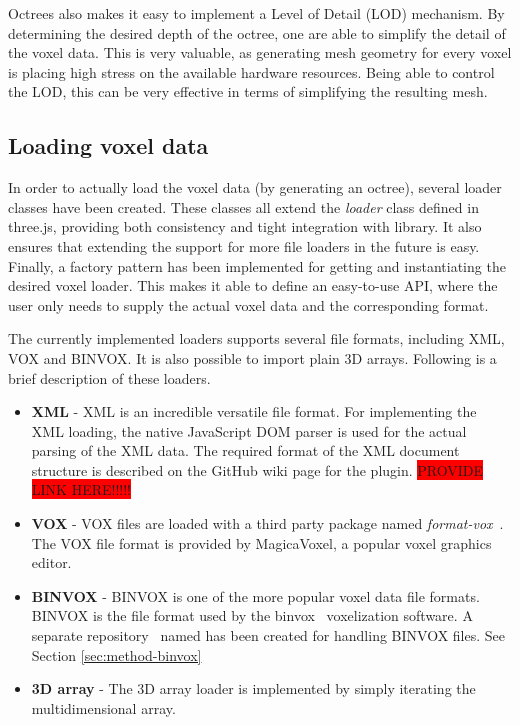 Octrees also makes it easy to implement a Level of Detail (LOD) mechanism. By determining the desired depth of the octree, one are able to simplify the detail of the voxel data. This is very valuable, as generating mesh geometry for every voxel is placing high stress on the available hardware resources. Being able to control the LOD, this can be very effective in terms of simplifying the resulting mesh.

\subsection{Loading voxel data}
In order to actually load the voxel data (by generating an octree), several loader classes have been created. These classes all extend the \textit{loader} class defined in three.js, providing both consistency and tight integration with library. It also ensures that extending the support for more file loaders in the future is easy. Finally, a factory pattern has been implemented for getting and instantiating the desired voxel loader. This makes it able to define an easy-to-use API, where the user only needs to supply the actual voxel data and the corresponding format.

The currently implemented loaders supports several file formats, including XML, VOX and BINVOX. It is also possible to import plain 3D arrays. Following is a brief description of these loaders.
\begin{itemize}
    \item \textbf{XML} - XML is an incredible versatile file format. For implementing the XML loading, the native JavaScript DOM parser is used for the actual parsing of the XML data. The required format of the XML document structure is described on the GitHub wiki page for the plugin. \colorbox{red}{PROVIDE LINK HERE!!!!!}
    \item \textbf{VOX} - VOX files are loaded with a third party package named \textit{format-vox}~\cite{format-vox}. The VOX file format is provided by MagicaVoxel, a popular voxel graphics editor.
    \item \textbf{BINVOX} - BINVOX \cite{binvox-file-format} is one of the more popular voxel data file formats. BINVOX is the file format used by the binvox~\cite{binvox} voxelization software. A separate repository~\cite{andstor-binvox} named has been created for handling BINVOX files. See Section \ref{sec:method-binvox}
    \item \textbf{3D array} - The 3D array loader is implemented by simply iterating the multidimensional array.
\end{itemize}

